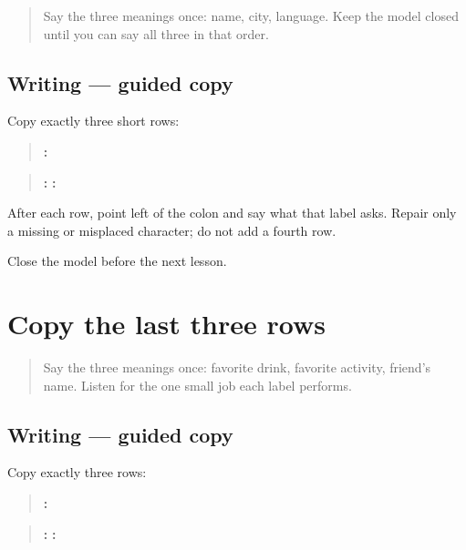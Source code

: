 \begin{quote}
Say the three meanings once: name, city, language. Keep the model closed until you can say all three in that order.
\end{quote}

\subsection*{Writing — guided copy}
Copy exactly three short rows:

\begin{quote}
\textbf{: }
\end{quote}

\begin{quote}
\textbf{: } \textbf{: }
\end{quote}

After each row, point left of the colon and say what that label asks. Repair only a missing or misplaced character; do not add a fourth row.

\begin{tcolorbox}[breakable,colback=teal!4,colframe=teal!35!black,title={Before you move on}]
Close the model before the next lesson.
\end{tcolorbox}
\section[\texorpdfstring{\mr{आवडते} \mr{पेय} · \mr{आवडती} … (āvaḍte pey …)}{आवडते पेय · आवडती … (āvaḍte pey …)}]{Copy the last three rows}

\label{lesson:MR-A1F02-last-three-copy}



\begin{quote}
Say the three meanings once: favorite drink, favorite activity, friend's name. Listen for the one small job each label performs.
\end{quote}

\subsection*{Writing — guided copy}
Copy exactly three rows:

\begin{quote}
\textbf{ : }
\end{quote}

\begin{quote}
\textbf{ : } \textbf{ : }
\end{quote}


